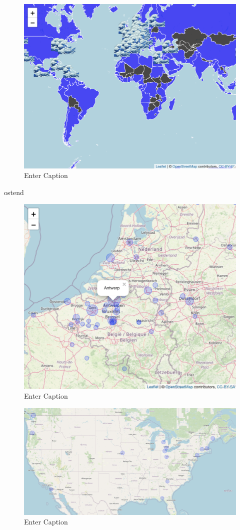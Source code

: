 \documentclass[a4paper, twoside, 12pt]{book}
\begin{document}
\begin{figure}
    \centering
    \includegraphics[width=1\linewidth]{landlocked countries plus ocean.png}
    \caption{Enter Caption}
    \label{fig:enter-label}
\end{figure}

ostend\\



\begin{figure}
    \centering
    \includegraphics[width=1\linewidth]{bel ostend birth.png}
    \caption{Enter Caption}
    \label{fig:enter-label}
\end{figure}
\begin{figure}
    \centering
    \includegraphics[width=0.5\linewidth]{Screenshot 2023-06-15 at 00.39.34.png}
    \caption{Enter Caption}
    \label{fig:enter-label}
\end{figure}
\end{document}

